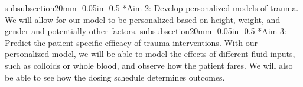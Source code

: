 \documentclass[11pt]{article}
\makeatletter
\renewcommand\subsubsection{\@startsection
	{subsubsection}{2}{0mm}
	{-0.05in}
	{-0.5\baselineskip}
	{\normalfont\normalsize\bfseries}}
\makeatother
\begin{document}
\subsubsection*{Aim 2: Develop personalized models of trauma. }
We will allow for our model to be personalized based on height, weight, and gender and potentially other factors. 
\subsubsection*{Aim 3: Predict the patient-specific efficacy of trauma interventions.} With our personalized model, we will be able to model the effects of different fluid inputs, such as colloids or whole blood, and observe how the patient fares. We will also be able to see how the dosing schedule determines outcomes.

%
\end{document}
